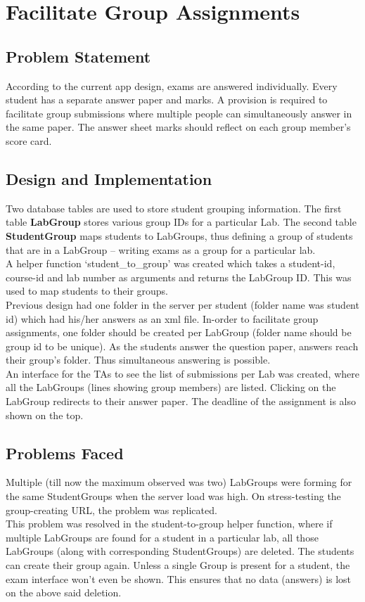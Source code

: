 \section{Facilitate Group Assignments}

\subsection{Problem Statement}
According to the current app design, exams are answered individually. Every student has a separate answer paper and marks. A provision is required to facilitate group submissions where multiple people can simultaneously answer in the same paper. The answer sheet marks should reflect on each group member's score card.

\subsection{Design and Implementation}
Two database tables are used to store student grouping information. The first table \textbf{LabGroup} stores various group IDs for a particular Lab. The second table \textbf{StudentGroup} maps students to LabGroups, thus defining a group of students that are in a LabGroup -- writing exams as a group for a particular lab.\\

A helper function `student\_to\_group' was created which takes a student-id, course-id and lab number as arguments and returns the LabGroup ID. This was used to map students to their groups.\\

Previous design had one folder in the server per student (folder name was student id) which had his/her answers as an xml file. In-order to facilitate group assignments, one folder should be created per LabGroup (folder name should be group id to be unique). As the students answer the question paper, answers reach their group's folder. Thus simultaneous answering is possible.\\

An interface for the TAs to see the list of submissions per Lab was created, where all the LabGroups (lines showing group members) are listed. Clicking on the LabGroup redirects to their answer paper. The deadline of the assignment is also shown on the top.

\subsection{Problems Faced}
Multiple (till now the maximum observed was two) LabGroups were forming for the same StudentGroups when the server load was high. On stress-testing the group-creating URL, the problem was replicated.\\

This problem was resolved in the student-to-group helper function, where if multiple LabGroups are found for a student in a particular lab, all those LabGroups (along with corresponding StudentGroups) are deleted. The students can create their group again. Unless a single Group is present for a student, the exam interface won't even be shown. This ensures that no data (answers) is lost on the above said deletion.

